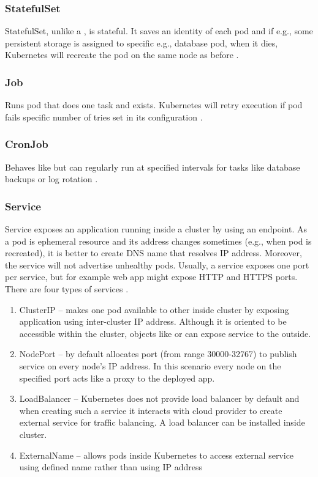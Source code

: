 \subsubsection{StatefulSet}
\label{statefulset}

StatefulSet, unlike a \textit{}, is stateful. It saves an identity of each pod and if e.g., some persistent storage is assigned to specific e.g., database pod, when it dies, Kubernetes will recreate the pod on the same node as before \cite{KubernetesDocs}.

\subsubsection{Job}
\label{job}

Runs pod that does one task and exists. Kubernetes will retry execution if pod fails specific number of tries set in its configuration \cite{KubernetesDocs}.

\subsubsection{CronJob}
\label{cronjob}
Behaves like \textit{} but can regularly run at specified intervals for tasks like database backups or log rotation \cite{KubernetesDocs}. 

\subsubsection{Service}
\label{svc}

Service exposes an application running inside a cluster by using an endpoint. As a pod is ephemeral resource and its address changes sometimes (e.g., when pod is recreated), it is better to create DNS name that resolves IP address. Moreover, the service will not advertise unhealthy pods. Usually, a service exposes one port per service, but for example web app might expose HTTP and HTTPS ports. There are four types of services \cite{KubernetesDocs}. 


\begin{enumerate}
    \item ClusterIP -- makes one pod available to other inside cluster by exposing application using inter-cluster IP address. Although it is oriented to be accessible within the cluster, objects like \textit{} or \textit{} can expose service to the outside.
    \item NodePort -- by default allocates port (from range 30000-32767) to publish service on every node's IP address. In this scenario every node on the specified port acts like a proxy to the deployed app.
    \item LoadBalancer -- Kubernetes does not provide load balancer by default and when creating such a service it interacts with cloud provider to create external service for traffic balancing. A load balancer can be installed inside cluster.
    \item ExternalName -- allows pods inside Kubernetes to access external service using defined name rather than using IP address 
\end{enumerate}

